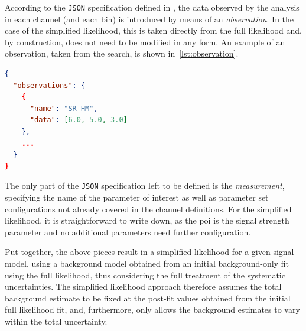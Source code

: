 According to the \texttt{JSON} specification defined in \cite{ATL-PHYS-PUB-2019-029}, the data observed by the analysis in each channel (and each bin) is introduced by means of an \textit{observation}. In the case of the simplified likelihood, this is taken directly from the full likelihood and, by construction, does not need to be modified in any form. An example of an observation, taken from the \onelepton search, is shown in~\cref{lst:observation}.

\begin{minipage}{\linewidth}
\begin{lstlisting}[language=json,firstnumber=1,caption={Example of an observation in the simplified likelihood, taken directly from the full likelihood of the \onelepton search. The number of events observed in data are given for each bin in the exclusion signal region SR-HM. Similar entries exist for all other regions, indicated by the dots `\dots'.},captionpos=b, label=lst:observation]
{
  "observations": {
    {
      "name": "SR-HM", 
      "data": [6.0, 5.0, 3.0]
    },
    ...
  }	
}
\end{lstlisting}
\end{minipage}

The only part of the \texttt{JSON} specification left to be defined is the \textit{measurement}, specifying the name of the parameter of interest as well as parameter set configurations not already covered in the channel definitions. For the simplified likelihood, it is straightforward to write down, as the \gls{poi} is the signal strength parameter and no additional parameters need further configuration. 


Put together, the above pieces result in a simplified likelihood for a given signal model, using a background model obtained from an initial background-only fit using the full likelihood, thus considering the full treatment of the systematic uncertainties.
The simplified likelihood approach therefore assumes the total background estimate to be fixed at the post-fit values obtained from the initial full likelihood fit, and, furthermore, only allows the background estimates to vary within the total uncertainty.

